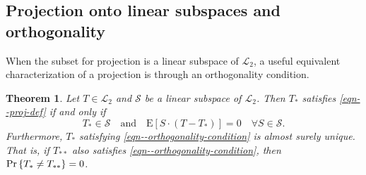 \documentclass[12pt]{article}
\def\Pr{\mathop{\rm Pr}\nolimits}
\numberwithin{equation}{section}
\theoremstyle{definition}
\theoremstyle{plain}
\newtheorem{theorem}{Theorem}[section]
\begin{document}
\subsection{Projection onto linear subspaces and orthogonality}

When the subset for projection is a linear subspace of \(\mathscr{L}_{2}\),
a useful equivalent characterization of a projection is through an orthogonality
condition.

\begin{theorem}
\label{thm--proj-orth-cond}
Let \(T \in \mathscr{L}_{2}\) and \(\mathcal{S}\) be a linear subspace of
\(\mathscr{L}_{2}\).
Then \(T_{\ast}\) satisfies \eqref{eqn--proj-def} if and only if
\begin{equation}
  T_{\ast} \in \mathcal{S} \quad \text{and} \quad \mathrm{E} \left[ S \cdot
  \left( T - T_{\ast} \right) \right] = 0 \quad \forall S \in \mathcal{S}.
  \label{eqn--orthogonality-condition}
\end{equation}
Furthermore, \(T_{\ast}\) satisfying \eqref{eqn--orthogonality-condition} is
almost surely unique.
That is, if \(T_{\ast \ast}\) also satisfies
\eqref{eqn--orthogonality-condition}, then \(\Pr \left\{ T_{\ast} \neq T_{\ast
\ast} \right\} = 0\).
\end{theorem}
\end{document}
